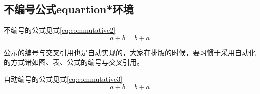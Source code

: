 \documentclass{article} %
\begin{document}
	\subsection{不编号公式equartion*环境}
	不编号的公式见式\ref{eq:commutative2}
	\begin{equation*}
		a + b = b + a \label{eq:commutative2}
	\end{equation*}

	公示的编号与交叉引用也是自动实现的，大家在排版的时候，要习惯于采用自动化的方式诸如图、表、公式的编号与交叉引用。
	
	自动编号的公式见式\ref{eq:commutative3}
	\begin{equation}
	a + b= b + a \label{eq:commutative3}
	\end{equation}
\end{document}

